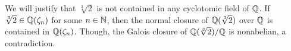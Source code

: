 \begin{exmp}
    We will justify that $\sqrt[3]{2}$ is not contained in any cyclotomic field of ${\mathbb{Q}}$.
    If $\sqrt[3]{2}\in{\mathbb{Q}}(\zeta_n)$ for some $n\in{\mathbb{N}}$, then the normal closure of ${\mathbb{Q}}(\sqrt[3]{2})$ over ${\mathbb{Q}}$ is contained in ${\mathbb{Q}}(\zeta_n)$.
    Though, the Galois closure of ${\mathbb{Q}}(\sqrt[3]{2})/{\mathbb{Q}}$ is nonabelian, a contradiction.
\end{exmp}